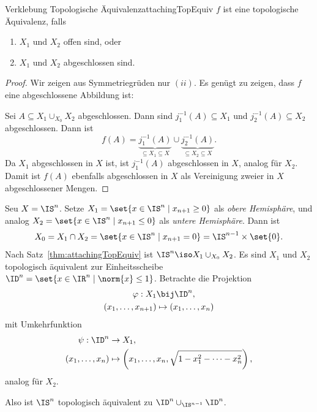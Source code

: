\documentclass[language=ngerman]{TemplateLecture} %
\begin{document}
\begin{thm}{Verklebung Topologische Äquivalenz}{attachingTopEquiv}
    $f$ ist eine topologische Äquivalenz, falls 
    \begin{enumerate}[$(i)$]
        \item $X_1$ und $X_2$ offen sind, oder
        \item $X_1$ und $X_2$ abgeschlossen sind.
    \end{enumerate}
\end{thm}
\begin{proof}
    Wir zeigen aus Symmetriegrüden nur $(ii)$. Es genügt zu zeigen, dass $f$ eine abgeschlossene Abbildung ist:

    Sei $A \subseteq X_1 \cup_{X_0} X_2$ abgeschlossen. Dann sind $j_1^{-1}(A) \subseteq X_1$ und $j_2^{-1}(A) \subseteq X_2$ abgeschlossen. Dann ist 
    \begin{equation*}
        f(A) = \underset{\subseteq X_1 \subseteq X}{\underbrace{j_1^{-1}(A)}} \cup \underset{\subseteq X_2 \subseteq X}{\underbrace{j_2^{-1}(A)}}.
    \end{equation*}
    Da $X_1$ abgeschlossen in $X$ ist, ist $j_1^{-1}(A)$ abgeschlossen in $X$, analog für $X_2$. Damit ist $f(A)$ ebenfalls abgeschlossen in $X$ als Vereinigung zweier in $X$ abgeschlossener Mengen.
\end{proof}

\begin{example}
    Seu $X = \IS^n$. Setze $X_1 = \set{x \in \IS^n \mid x_{n+1} \geq 0}$ als \emph{obere Hemisphäre}, und analog $X_2 = \set{x \in \IS^n \mid x_{n+1} \leq 0}$ als \emph{untere Hemisphäre}. Dann ist 
    \begin{equation*}
        X_0 = X_1 \cap X_2 = \set{x \in \IS^n \mid x_{n+1} = 0} = \IS^{n-1} \times \set{0}.
    \end{equation*} 
    Nach Satz~\ref{thm:attachingTopEquiv} ist $\IS^n \iso X_1 \cup_{X_0} X_2$. Es sind $X_1$ und $X_2$ topologisch äquivalent zur Einheitsscheibe $\ID^n = \set{x \in \IR^n \mid \norm{x} \leq 1}$. Betrachte die Projektion
    \begin{align*}
        \varphi: X_1 &\bij \ID^n,  \\
        (x_1,\ldots,x_{n+1}) &\mapsto (x_1, \ldots, x_n)
    \end{align*}
    mit Umkehrfunktion 
    \begin{align*}
        \psi: \ID^n &\to X_1, \\
        (x_1, \ldots, x_n) &\mapsto \left(x_1, \ldots, x_n, \sqrt{1 - x_1^2 - \cdots - x_n^2}\right),
    \end{align*}
    analog für $X_2$.

    Also ist $\IS^n$ topologisch äquivalent zu $\ID^n \cup_{\IS^{n-1}} \ID^n$.
\end{example}
\end{document}

